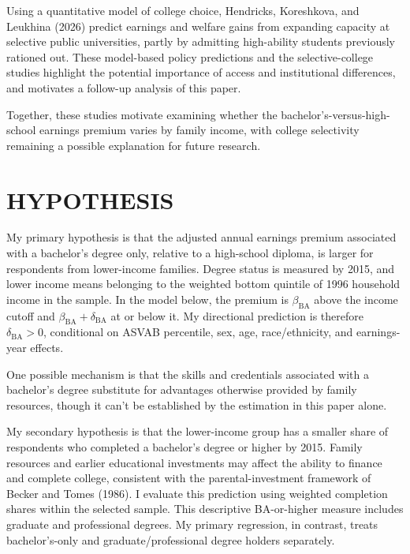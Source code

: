 \documentclass[12pt,letterpaper]{article}
\begin{document}
Using a quantitative model of college choice, Hendricks, Koreshkova, and Leukhina
(2026) predict earnings and welfare gains from expanding capacity at selective
public universities, partly by admitting high-ability students previously rationed
out. These model-based policy predictions and the selective-college studies
highlight the potential importance of access and institutional differences, 
and motivates a follow-up analysis of this paper.\newline

Together, these studies motivate examining whether the bachelor’s-versus-high-school 
earnings premium varies by family income, with college selectivity remaining a possible
 explanation for future research.

\section*{HYPOTHESIS}
My primary hypothesis is that the adjusted annual earnings premium associated with
a bachelor's degree only, relative to a high-school diploma, is larger for respondents
from lower-income families. Degree status is measured by 2015, and lower income
means belonging to the weighted bottom quintile of 1996 household income in the sample. 
In the model below, the premium is $\beta_{\mathrm{BA}}$ above the
income cutoff and $\beta_{\mathrm{BA}}+\delta_{\mathrm{BA}}$ at or below it.
My directional prediction is therefore $\delta_{\mathrm{BA}}>0$,
conditional on ASVAB percentile, sex, age, race/ethnicity, and earnings-year effects.\newline

One possible mechanism is that the skills and credentials associated with a
bachelor's degree substitute for advantages otherwise provided by family resources, 
though it can't be established by the estimation in this paper alone. \newline

My secondary hypothesis is that the lower-income group has a smaller share of
respondents who completed a bachelor's degree or higher by 2015. Family resources
and earlier educational investments may affect the ability to finance and complete
college, consistent with the parental-investment framework of Becker and Tomes
(1986). I evaluate this prediction using weighted completion shares within the
selected sample. This descriptive BA-or-higher measure includes graduate and
professional degrees. My primary regression, in contrast, treats bachelor's-only and
graduate/professional degree holders separately.\newline
\end{document}
